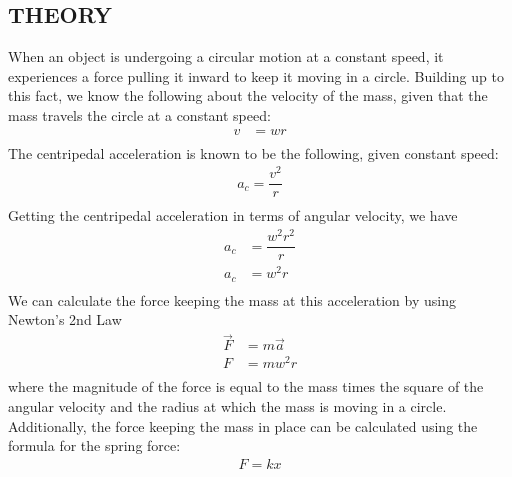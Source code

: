 \documentclass [12pt, letterpaper, twoside] {article}
\begin{document}
\subsection* {THEORY}
\noindent
When an object is undergoing a circular motion at a constant speed, it experiences a force pulling it inward to keep it moving in a circle. Building up to this fact, we know the following about the velocity of the mass, given that the mass travels the circle at a constant speed:
\begin {equation*}
  \begin {split}
    v &= wr \\ 
  \end {split}
\end {equation*}
The centripedal acceleration is known to be the following, given constant speed:
\begin {equation*}
  \begin {split}
    a_{c} = \dfrac{v^2}{r} \\
  \end {split}
\end {equation*}
Getting the centripedal acceleration in terms of angular velocity, we have
\begin {equation*}
  \begin {split}
    a_{c} &= \dfrac{w^{2}r^{2}}{r} \\
    a_{c} &= w^{2}r \\
  \end {split}
\end {equation*}
We can calculate the force keeping the mass at this acceleration by using Newton's 2nd Law
\begin {equation}
  \begin {split}
    \vec{F} &= m\vec{a} \\
    F &= mw^{2}r \\
  \end {split}
\end {equation}
where the magnitude of the force is equal to the mass times the square of the angular velocity and the radius at which the mass is moving in a circle. Additionally, the force keeping the mass in place can be calculated using the formula for the spring force:
\begin {equation*}
  \begin {split}
    F = kx \\
  \end {split}
\end {equation*}
\end{document}
